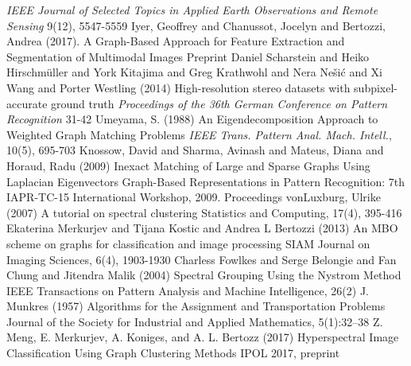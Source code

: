 \documentclass{beamer}
\begin{document}
\begin{frame}[allowframebreaks]
{\begin{thebibliography}{99}
      \newblock \emph{IEEE Journal of Selected Topics in Applied Earth Observations and Remote Sensing} 9(12), 5547-5559
     Iyer, Geoffrey and Chanussot, Jocelyn and Bertozzi, Andrea (2017).
      \newblock A Graph-Based Approach for Feature Extraction and Segmentation of Multimodal Images
      \newblock Preprint
     Daniel Scharstein and Heiko Hirschm\"{u}ller and York Kitajima and Greg Krathwohl and Nera Ne\v{s}i\'{c} and Xi Wang and Porter Westling (2014)
      \newblock High-resolution stereo datasets with subpixel-accurate ground truth
      \newblock \emph{Proceedings of the 36th German Conference on Pattern Recognition} 31-42
     Umeyama, S. (1988)
      \newblock An Eigendecomposition Approach to Weighted Graph Matching Problems
      \newblock \emph{IEEE Trans. Pattern Anal. Mach. Intell.}, 10(5), 695-703
     Knossow, David and Sharma, Avinash and Mateus, Diana and Horaud, Radu (2009)
      \newblock Inexact Matching of Large and Sparse Graphs Using Laplacian Eigenvectors
      \newblock Graph-Based Representations in Pattern Recognition: 7th IAPR-TC-15 International Workshop, 2009. Proceedings
     vonLuxburg, Ulrike (2007)
      \newblock A tutorial on spectral clustering
      \newblock Statistics and Computing, 17(4), 395-416
     Ekaterina Merkurjev and Tijana Kostic and Andrea L Bertozzi (2013)
      \newblock An MBO scheme on graphs for classification and image processing
      \newblock SIAM Journal on Imaging Sciences, 6(4), 1903-1930
     Charless Fowlkes and Serge Belongie and Fan Chung and Jitendra Malik (2004)
      \newblock Spectral Grouping Using the Nystrom Method
      \newblock IEEE Transactions on Pattern Analysis and Machine Intelligence, 26(2)
     J. Munkres (1957)
      \newblock Algorithms for the Assignment and Transportation Problems
      \newblock Journal of the Society for Industrial and Applied Mathematics, 5(1):32–38
     Z. Meng, E. Merkurjev, A. Koniges, and A. L. Bertozz (2017)
      \newblock Hyperspectral Image Classification Using Graph Clustering Methods
      \newblock IPOL 2017, preprint
    \end{thebibliography}
  }
\end{frame}
\end{document}
